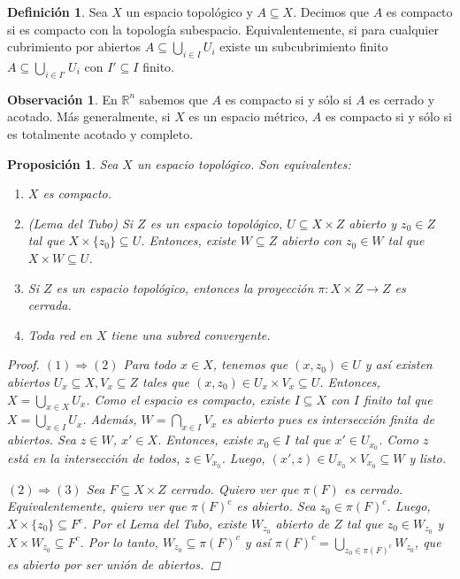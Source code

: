 \documentclass[12pt]{book}
\newtheorem{prop}[teo]{Proposición}
\theoremstyle{definition}
\newtheorem{obs}[teo]{Observación}
\newtheorem{defn}[teo]{Definición}
\newcommand{\RR}{\mathbb{R}}      %
\begin{document}
\begin{defn}
Sea $X$ un espacio topológico y $A\subseteq X$. Decimos que $A$ es compacto si es compacto con la topología subespacio. Equivalentemente, si para cualquier cubrimiento por abiertos $A\subseteq \displaystyle\bigcup_{i\in I}U_i$ existe un subcubrimiento finito $A\subseteq\displaystyle\bigcup_{i\in I'} U_i$ con $I'\subseteq I$ finito.
\end{defn}

\begin{obs}
En $\RR^n$ sabemos que $A$ es compacto si y sólo si $A$ es cerrado y acotado. Más generalmente, si $X$ es un espacio métrico, $A$ es compacto si y sólo si es totalmente acotado y completo.
\end{obs}

\begin{prop}
Sea $X$ un espacio topológico. Son equivalentes:
\begin{enumerate}
\item $X$ es compacto.
\item (Lema del Tubo) Si $Z$ es un espacio topológico, $U\subseteq X\times Z$ abierto y $z_0\in Z$ tal que $X\times \{z_0\}\subseteq U$. Entonces, existe $W\subseteq Z$ abierto con $z_0\in W$ tal que $X\times W\subseteq U$.
\item Si $Z$ es un espacio topológico, entonces la proyección $\pi:X\times Z\to Z$ es cerrada.
\item Toda red en $X$ tiene una subred convergente.
\end{enumerate}
\begin{proof}

$(1)\Longrightarrow (2)$ Para todo $x\in X$, tenemos que $(x,z_0)\in U$ y así existen abiertos $U_x\subseteq X, V_x\subseteq Z$ tales que $(x,z_0)\in U_x\times V_x\subseteq U$. Entonces, $X = \displaystyle\bigcup_{x\in X} U_x$. Como el espacio es compacto, existe $I\subseteq X$ con $I$ finito tal que $X = \displaystyle\bigcup_{x\in I} U_x$. Además, $W = \displaystyle\bigcap_{x\in I} V_x$ es abierto pues es intersección finita de abiertos. Sea $z\in W$, $x'\in X$. Entonces, existe $x_0\in I$ tal que $x'\in U_{x_0}$. Como $z$ está en la intersección de todos, $z\in V_{x_0}$. Luego, $(x',z)\in U_{x_0}\times V_{x_0}\subseteq W$ y listo.

$(2)\Longrightarrow (3)$ Sea $F\subseteq X\times Z$ cerrado. Quiero ver que $\pi(F)$ es cerrado. Equivalentemente, quiero ver que $\pi(F)^c$ es abierto. Sea $z_0\in \pi(F)^c$. Luego, $X\times\{z_0\}\subseteq F^c$. Por el Lema del Tubo, existe $W_{z_0}$ abierto de $Z$ tal que $z_0\in W_{z_0}$ y $X\times W_{z_0}\subseteq F^c$. Por lo tanto, $W_{z_0}\subseteq \pi(F)^c$ y así $\pi(F)^c = \displaystyle\bigcup_{z_0\in\pi(F)^c} W_{z_0}$, que es abierto por ser unión de abiertos.


\end{proof}
\end{prop}
\end{document}

